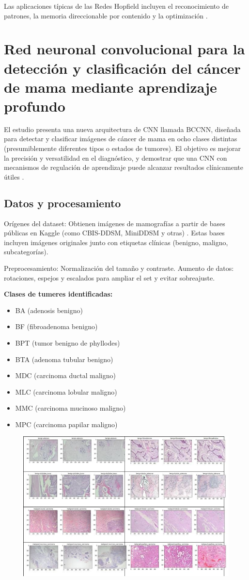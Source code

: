 Las aplicaciones típicas de las Redes Hopfield incluyen el reconocimiento de patrones, la memoria direccionable por contenido y la optimización .

\section{Red neuronal convolucional para la detección y clasificación del cáncer de mama mediante aprendizaje profundo}
El estudio presenta una nueva arquitectura de CNN llamada BCCNN, diseñada para detectar y clasificar imágenes de cáncer de mama en ocho clases distintas (presumiblemente diferentes tipos o estados de tumores). El objetivo es mejorar la precisión y versatilidad en el diagnóstico, y demostrar que una CNN con mecanismos de regulación de aprendizaje puede alcanzar resultados clínicamente útiles \citep{abunasser2023cnn}.
\subsection{Datos y procesamiento}

Orígenes del dataset: Obtienen imágenes de mamografías a partir de bases públicas en Kaggle (como CBIS-DDSM, MiniDDSM y otras) .
Estas bases incluyen imágenes originales junto con etiquetas clínicas (benigno, maligno, subcategorías).

Preprocesamiento:
Normalización del tamaño y contraste.
Aumento de datos: rotaciones, espejos y escalados para ampliar el set y evitar sobreajuste.

\textbf{Clases de tumeres identificadas:}
\begin{itemize}
    \item BA (adenosis benigno)
    \item BF (fibroadenoma benigno)
    \item BPT (tumor benigno de phyllodes)
    \item BTA (adenoma tubular benigno)
    \item MDC (carcinoma ductal maligno)
    \item MLC (carcinoma lobular maligno)
    \item MMC (carcinoma mucinoso maligno)
    \item MPC (carcinoma papilar maligno)
\end{itemize}
\begin{figure}
    \centering
    \includegraphics[width=0.5\linewidth]{cancer.jpg}
    \caption{}
    \label{fig:enter-label}
\end{figure}


